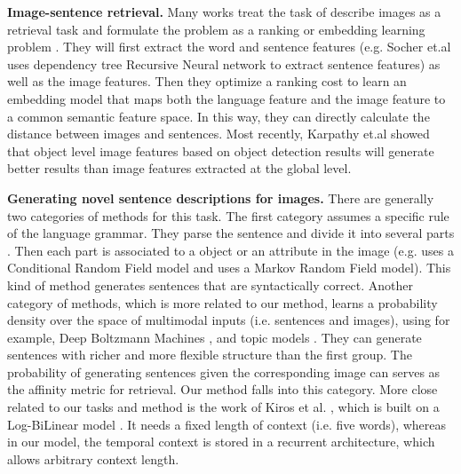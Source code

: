 \textbf{Image-sentence retrieval.}
Many works treat the task of describe images as a retrieval task and formulate the problem as a ranking or embedding learning problem \cite{hodosh2013framing,frome2013devise,socher2014grounded}.
They will first extract the word and sentence features (e.g. Socher et.al \cite{socher2014grounded} uses dependency tree Recursive Neural network to extract sentence features) as well as the image features.
Then they optimize a ranking cost to learn an embedding model that maps both the language feature and the image feature to a common semantic feature space.
In this way, they can directly calculate the distance between images and sentences.
Most recently, Karpathy et.al \cite{karpathy2014fragment} showed that object level image features based on object detection results will generate better results than image features extracted at the global level.

\textbf{Generating novel sentence descriptions for images.}
There are generally two categories of methods for this task.
The first category assumes a specific rule of the language grammar.
They parse the sentence and divide it into several parts \cite{mitchell2012midge,gupta2012image}.
Then each part is associated to a object or an attribute in the image (e.g. \cite{kulkarni2011baby} uses a Conditional Random Field model and \cite{farhadi2010every} uses a Markov Random Field model).
This kind of method generates sentences that are syntactically correct.
Another category of methods, which is more related to our method, learns a probability density over the space of multimodal inputs (i.e. sentences and images), using for example, Deep Boltzmann Machines \cite{srivastava2012multimodal}, and topic models \cite{barnard2003matching,jia2011learning}.
They can generate sentences with richer and more flexible structure than the first group.
The probability of generating sentences given the corresponding image can serves as the affinity metric for retrieval.
Our method falls into this category.
More close related to our tasks and method is the work of Kiros et al. \cite{kiros2013multimodal}, which is built on a Log-BiLinear model \cite{mnih2007three}.
It needs a fixed length of context (i.e. five words), whereas in our model, the temporal context is stored in a recurrent architecture, which allows arbitrary context length.
